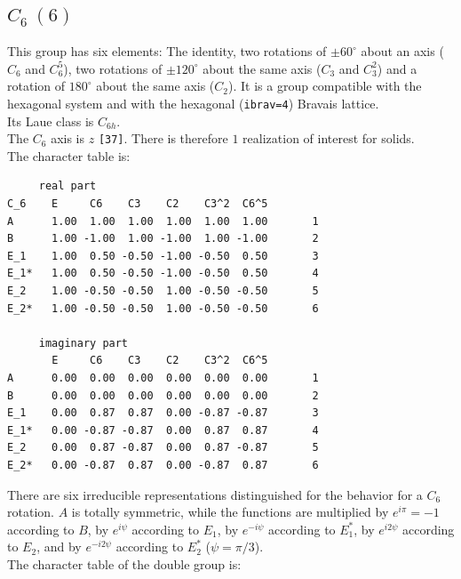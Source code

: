 \documentclass[12pt,a4paper]{article}
\begin{document}
\subsection{\color{web-blue}$C_6\ (6)$}
This group has six elements: The identity, two rotations of $\pm60^\circ$ 
about an axis ($C_6$ and $C_6^5$), two rotations of $\pm120^\circ$
about the same axis ($C_3$ and $C_3^2$) and a rotation of $180^\circ$ about 
the same axis ($C_2$).
It is a group compatible with the hexagonal system and with the
hexagonal (\texttt{ibrav=4}) Bravais lattice. \\ 
Its Laue class is $C_{6h}$. \\
The $C_6$ axis is $z$ \texttt{[37]}.
There is therefore $1$ realization of interest for solids. \\
The character table is:
\begin{verbatim}
     real part
C_6    E     C6    C3    C2    C3^2  C6^5 
A      1.00  1.00  1.00  1.00  1.00  1.00       1
B      1.00 -1.00  1.00 -1.00  1.00 -1.00       2
E_1    1.00  0.50 -0.50 -1.00 -0.50  0.50       3 
E_1*   1.00  0.50 -0.50 -1.00 -0.50  0.50       4
E_2    1.00 -0.50 -0.50  1.00 -0.50 -0.50       5
E_2*   1.00 -0.50 -0.50  1.00 -0.50 -0.50       6

     imaginary part
       E     C6    C3    C2    C3^2  C6^5 
A      0.00  0.00  0.00  0.00  0.00  0.00       1
B      0.00  0.00  0.00  0.00  0.00  0.00       2
E_1    0.00  0.87  0.87  0.00 -0.87 -0.87       3
E_1*   0.00 -0.87 -0.87  0.00  0.87  0.87       4
E_2    0.00  0.87 -0.87  0.00  0.87 -0.87       5
E_2*   0.00 -0.87  0.87  0.00 -0.87  0.87       6
\end{verbatim}
There are six irreducible representations distinguished for
the behavior for a $C_6$ rotation. $A$ is totally symmetric, while
the functions are multiplied by $e^{i\pi}=-1$ according
to $B$, by $e^{i\psi}$ according to $E_1$, by $e^{-i\psi}$ 
according to $E_1^*$, by $e^{i2\psi}$ according to $E_2$, and by $e^{-i2\psi}$
according to $E_2^*$ ($\psi=\pi/3$). \\
The character table of the double group is:
\end{document}
